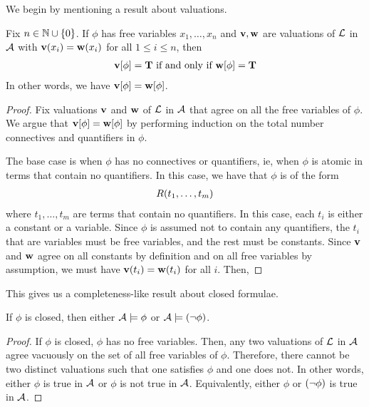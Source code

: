 We begin by mentioning a result about valuations.

\begin{boxtheorem}
    Fix $n \in \mathbb{N} \cup \left\{ 0 \right\}$. If $\phi$ has free variables $x_1, \ldots, x_n$ and $\mathbf{v}, \mathbf{w}$ are valuations of $\mathcal{L}$ in $\mathcal{A}$ with $\mathbf{v}\!\left( x_i \right) = \mathbf{w}\!\left( x_i \right)$ for all $1 \leq i \leq n$, then
    \begin{align*}
        \mathbf{v}\!\left[ \phi \right] = \mathbf{T} \text{ if and only if } \mathbf{w}\!\left[ \phi \right] = \mathbf{T}
    \end{align*}
    In other words, we have $\mathbf{v}\!\left[ \phi \right] = \mathbf{w}\!\left[ \phi \right]$.
\end{boxtheorem}
\begin{proof}
    Fix valuations $\mathbf{v}$ and $\mathbf{w}$ of $\mathcal{L}$ in $\mathcal{A}$ that agree on all the free variables of $\phi$. We argue that $\mathbf{v}\!\left[ \phi \right] = \mathbf{w}\!\left[ \phi \right]$ by performing induction on the total number connectives and quantifiers in $\phi$.

    The base case is when $\phi$ has no connectives or quantifiers, ie, when $\phi$ is atomic in terms that contain no quantifiers. In this case, we have that $\phi$ is of the form
    \begin{align*}
        R\!\left( t_1, \ldots, t_m \right)
    \end{align*}
    where $t_1, \ldots, t_m$ are terms that contain no quantifiers. In this case, each $t_i$ is either a constant or a variable. Since $\phi$ is assumed not to contain any quantifiers, the $t_i$ that are variables must be free variables, and the rest must be constants. Since $\mathbf{v}$ and $\mathbf{w}$ agree on all constants by definition and on all free variables by assumption, we must have
    $\mathbf{v}\!\left( t_i \right) = \mathbf{w}\!\left( t_i \right)$ for all $i$. Then, \sorry
\end{proof}

This gives us a completeness-like result about closed formulae.

\begin{boxcorollary}
    If $\phi$ is closed, then either $\mathcal{A} \models \phi$ or $\mathcal{A} \models \left( \neg \phi \right)$.
\end{boxcorollary}
\begin{proof}
    If $\phi$ is closed, $\phi$ has no free variables. Then, any two valuations of $\mathcal{L}$ in $\mathcal{A}$ agree vacuously on the set of all free variables of $\phi$. Therefore, there cannot be two distinct valuations such that one satisfies $\phi$ and one does not. In other words, either $\phi$ is true in $\mathcal{A}$ or $\phi$ is not true in $\mathcal{A}$. Equivalently, either $\phi$ or $\left( \neg \phi \right)$ is true in $\mathcal{A}$. 
\end{proof}


